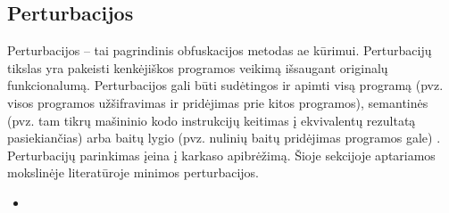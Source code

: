\subsection{Perturbacijos}\label{sec:literature:perturbations}

Perturbacijos -- tai pagrindinis obfuskacijos metodas \ac{ae} kūrimui. Perturbacijų tikslas yra pakeisti kenkėjiškos programos veikimą išsaugant originalų funkcionalumą. Perturbacijos gali būti sudėtingos ir apimti visą programą (pvz. visos programos užšifravimas ir pridėjimas prie kitos programos), semantinės (pvz. tam tikrų mašininio kodo instrukcijų keitimas į ekvivalentų rezultatą pasiekiančias) arba baitų lygio (pvz. nulinių baitų pridėjimas programos gale) \citeplace. Perturbacijų parinkimas įeina į karkaso apibrėžimą. Šioje sekcijoje aptariamos mokslinėje literatūroje minimos perturbacijos.
\begin{itemize}
    \item 
\end{itemize}